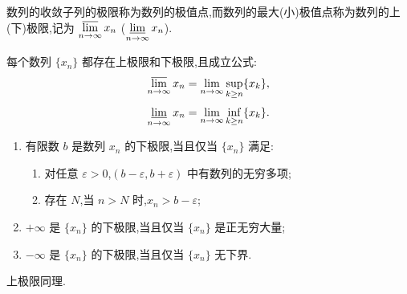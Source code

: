 \documentclass[../数学分析培优讲义.tex]{subfiles}
\begin{document}
\begin{definition}
数列的收敛子列的极限称为数列的极值点,而数列的最大(小)极值点称为数列的上(下)极限,记为
$\displaystyle \varlimsup\limits_{n\to\infty}x_n$
($\displaystyle \varliminf\limits_{n\to\infty}x_n$).
\end{definition}

\begin{proposition}
每个数列 $\{x_n\}$ 都存在上极限和下极限,且成立公式:
\[
\varlimsup\limits_{n\to\infty}x_n
=
\lim\limits_{n\to\infty}\sup_{k\geq n}\{x_k\},
\]
\[
\varliminf\limits_{n\to\infty}x_n
=
\lim\limits_{n\to\infty}\inf_{k\geq n}\{x_k\}.
\]
\end{proposition}

\begin{proposition}
\begin{enumerate}[label=(\arabic*)]
  \item 有限数 $b$ 是数列 $x_n$ 的下极限,当且仅当 $\{x_n\}$ 满足:
  \begin{enumerate}[label=(\roman*)]
    \item 对任意 $\varepsilon>0$,$(b-\varepsilon,b+\varepsilon)$ 中有数列的无穷多项;
    \item 存在 $N$,当 $n>N$ 时,$x_n>b-\varepsilon$;
  \end{enumerate}
  \item $+\infty$ 是 $\{x_n\}$ 的下极限,当且仅当 $\{x_n\}$ 是正无穷大量;
  \item $-\infty$ 是 $\{x_n\}$ 的下极限,当且仅当 $\{x_n\}$ 无下界.
\end{enumerate}
上极限同理.
\end{proposition}
\end{document}
